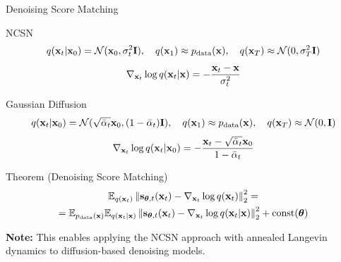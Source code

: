 \documentclass{beamer}
\begin{document}
\begin{frame}{Denoising Score Matching}
	\begin{block}{NCSN} 
		\vspace{-0.7cm} 
		\[
			q(\mathbf{x}_t | \mathbf{x}_0) = \mathcal{N}(\mathbf{x}_0, \sigma_t^2 \mathbf{I}), \quad q(\mathbf{x}_1) \approx p_{\text{data}}(\mathbf{x}), \quad q(\mathbf{x}_T) \approx \mathcal{N}(0, \sigma_T^2 \mathbf{I})
		\]
		\[
			\nabla_{\mathbf{x}_t} \log q(\mathbf{x}_t | \mathbf{x}) = - \frac{\mathbf{x}_t - \mathbf{x}}{\sigma_t^2}
		\]
		\vspace{-0.6cm} 
	\end{block}
    \eqpause
	\begin{block}{Gaussian Diffusion}
		\vspace{-0.7cm} 
		\[
			q(\mathbf{x}_t | \mathbf{x}_0) = \mathcal{N}(\sqrt{\bar{\alpha}_t} \mathbf{x}_0, (1 - \bar{\alpha}_t) \mathbf{I}), \quad q(\mathbf{x}_1) \approx p_{\text{data}}(\mathbf{x}), \quad q(\mathbf{x}_T) \approx \mathcal{N}(0, \mathbf{I})
		\]
		\[
			\nabla_{\mathbf{x}_t} \log q(\mathbf{x}_t | \mathbf{x}_0) = - \frac{\mathbf{x}_t - \sqrt{\bar{\alpha}_t} \mathbf{x}_0}{1 - \bar{\alpha}_t}
		\]
		\vspace{-0.6cm} 
	\end{block}
    \eqpause
	\begin{block}{Theorem (Denoising Score Matching)}
		\vspace{-0.7cm}
		\begin{multline*}
			\mathbb{E}_{q(\mathbf{x}_t)}\left\| \mathbf{s}_{\boldsymbol{\theta}, t}(\mathbf{x}_t) - \nabla_{\mathbf{x}_t} \log q(\mathbf{x}_t) \right\|_2^2 = \\
			= \mathbb{E}_{p_{\text{data}}(\mathbf{x})} \mathbb{E}_{q(\mathbf{x}_t | \mathbf{x})}\left\| \mathbf{s}_{\boldsymbol{\theta}, t}(\mathbf{x}_t) - \nabla_{\mathbf{x}_t} \log q(\mathbf{x}_t | \mathbf{x}) \right\|_2^2 + \text{const}(\boldsymbol{\theta})
		\end{multline*}
		\vspace{-0.5cm}
	\end{block}
    \eqpause
	\textbf{Note:} This enables applying the NCSN approach with annealed Langevin dynamics to diffusion-based denoising models.
\end{frame}
\end{document}
